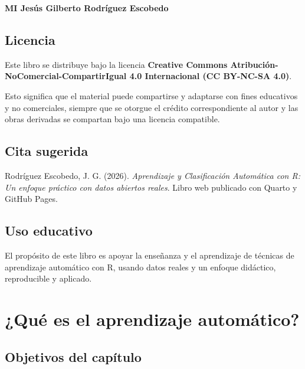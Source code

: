\documentclass[
  spanish,
  11pt,
  letterpaper,
]{book}
\begin{document}
\textbf{MI Jesús Gilberto Rodríguez Escobedo}

\section*{Licencia}\label{licencia}


Este libro se distribuye bajo la licencia \textbf{Creative Commons
Atribución-NoComercial-CompartirIgual 4.0 Internacional (CC BY-NC-SA
4.0)}.

Esto significa que el material puede compartirse y adaptarse con fines
educativos y no comerciales, siempre que se otorgue el crédito
correspondiente al autor y las obras derivadas se compartan bajo una
licencia compatible.

\section*{Cita sugerida}\label{cita-sugerida}


Rodríguez Escobedo, J. G. (2026). \emph{Aprendizaje y Clasificación
Automática con R: Un enfoque práctico con datos abiertos reales}. Libro
web publicado con Quarto y GitHub Pages.

\section*{Uso educativo}\label{uso-educativo}


El propósito de este libro es apoyar la enseñanza y el aprendizaje de
técnicas de aprendizaje automático con R, usando datos reales y un
enfoque didáctico, reproducible y aplicado.


\chapter{¿Qué es el aprendizaje
automático?}\label{quuxe9-es-el-aprendizaje-automuxe1tico}

\section{Objetivos del capítulo}\label{objetivos-del-capuxedtulo}
\end{document}
